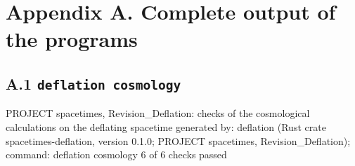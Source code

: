 \documentclass[
  10pt,
]{article}
\newenvironment{Shaded}{}{}
\newcommand{\NormalTok}[1]{#1}
\begin{document}
\hypertarget{appendix-a.-complete-output-of-the-programs}{%
\section{Appendix A. Complete output of the
programs}\label{appendix-a.-complete-output-of-the-programs}}

\hypertarget{a.1-deflation-cosmology}{%
\subsection{\texorpdfstring{A.1
\texttt{deflation\ cosmology}}{A.1 deflation cosmology}}\label{a.1-deflation-cosmology}}

\begin{Shaded}
\begin{Highlighting}[]
\NormalTok{PROJECT spacetimes, Revision\_Deflation: checks of the cosmological calculations on the deflating spacetime}
\NormalTok{generated by: deflation (Rust crate spacetimes{-}deflation, version 0.1.0; PROJECT spacetimes, Revision\_Deflation); command: deflation cosmology}
\NormalTok{6 of 6 checks passed}


\end{Highlighting}
\end{Shaded}
\end{document}
